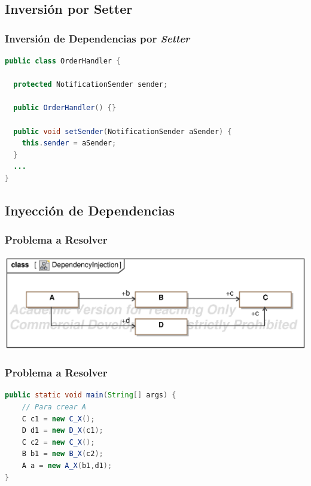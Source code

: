 \documentclass[a4paper,t,xcolor=pst,dvips,colortheme]{beamer}
\begin{document}
\subsection{Inversión por Setter}

\begin{frame}[c,fragile]
	\frametitle{Inversión de Dependencias por \emph{Setter}}
\begin{lstlisting}[basicstyle=\footnotesize,language=Java]
public class OrderHandler {

  protected NotificationSender sender;
	
  public OrderHandler() {}
	
  public void setSender(NotificationSender aSender) {
    this.sender = aSender;
  }
  ...
}
\end{lstlisting}
\end{frame}

\subsection{Inyección de Dependencias}

\begin{frame}[c]
	\frametitle{Problema a Resolver}
	\begin{center}
        \includegraphics[width=\linewidth,keepaspectratio=true]{images/iod/DependencyInjection.eps}
	\end{center}
\end{frame}

\begin{frame}[c,fragile]
	\frametitle{Problema a Resolver}
\begin{lstlisting}[basicstyle=\footnotesize,language=Java]
public static void main(String[] args) {
    // Para crear A
    C c1 = new C_X();
    D d1 = new D_X(c1);
    C c2 = new C_X();
    B b1 = new B_X(c2);
    A a = new A_X(b1,d1);
}
\end{lstlisting}
\end{frame}
\end{document}
